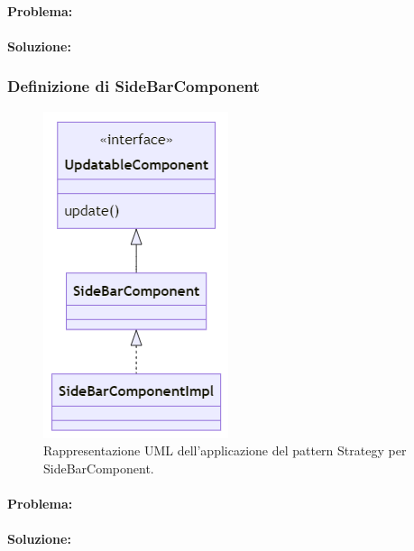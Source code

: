 \paragraph{Problema:}
\paragraph{Soluzione:}

\subsubsection*{Definizione di SideBarComponent}
\begin{figure}[ht]
    \centering\includegraphics[]{images/SideBar_uml.png}
    \caption{Rappresentazione UML dell'applicazione del pattern Strategy per SideBarComponent.}
\end{figure}
\paragraph{Problema:}
\paragraph{Soluzione:}

